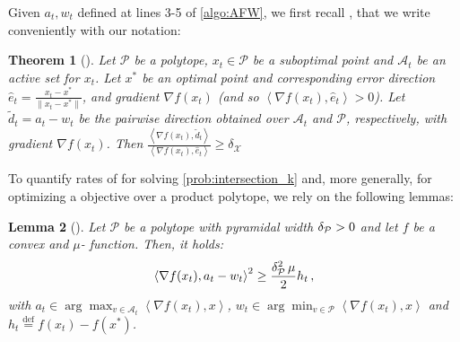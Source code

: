 \documentclass[twoside]{article}
\newcommand\linktoproof[1]{{\normalfont[{\hyperlink{proof:#1}{$\downarrow$}}]}}
\newcommand{\mP}{\mathcal{P}}
\newcommand{\mA}{\mathcal{A}}
\newcommand{\mX}{\mathcal{X}}
\newcommand{\innp}[1]{\left\langle #1 \right\rangle}
\newcommand{\defi}{\stackrel{\mathrm{\scriptscriptstyle def}}{=}}
\newtheorem{theorem}{Theorem}[section]
\newtheorem{lemma}[theorem]{Lemma}
\begin{document}
Given $a_t, w_t$ defined at lines 3-5 of \cref{algo:AFW}, we first recall {\citep[Theorem 3]{LJ15}}, that we write conveniently with our notation:
%
\begin{theorem}[{\citep[Theorem 3]{LJ15}}]\label{thm:scaling_ineq}
Let $\mP$ be a polytope, $x_t \in \mP$ be a suboptimal point and $\mA_t$ be an active set for $x_t$. Let $x^\ast$ be an optimal point and corresponding error direction $\hat{e}_t =  \frac{x_t - x^\ast}{\|x_t - x^\ast\|}$, and gradient $\nabla f(x_t)$ (and so $\innp{\nabla f(x_t), \hat{e}_t} > 0$). Let $\tilde{d}_t = a_t - w_t$ be the pairwise \FW{} direction obtained over $\mA_t$ and $\mP$, respectively, with gradient $\nabla f(x_t)$. Then
$\frac{\innp{\nabla f(x_t), \tilde{d}_t}}{\innp{\nabla f(x_t), \hat{e}_t}} \ge \delta_\mX$
\label{thm:pyrwidth}
\end{theorem}
%
To quantify rates of \AFW{} for solving \cref{prob:intersection_k} and, more generally, for optimizing a \PL{} objective over a product polytope, we rely on the following lemmas:
%
\begin{lemma}[]
\label{lemma:geom_pl}%
Let $\mP$ be a polytope with pyramidal width $\pw{\mP} > 0$ and let $f$ be a convex and $\mu$-\PL{} function. Then, it holds:
\begin{equation}%
%
    \innp{\nabla f(x_t), a_t - w_t}^2 \ge \frac{\pw[2]{\mP} \mu}{2}h_t\,,
\end{equation}
with $a_t \in \arg\max_{v \in \mA_t} \innp{\nabla f(x_t), x}$, $w_t \in \arg\min_{v \in \mP} \innp{\nabla f(x_t), x}$ and $h_t \defi f(x_t) - f(x^\ast)$.
\end{lemma}
%
\end{document}
